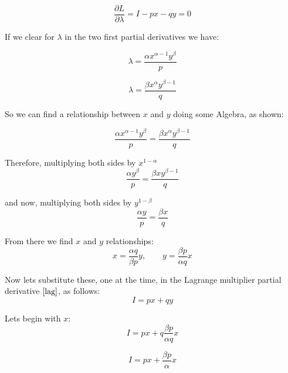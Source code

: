 \documentclass{article}
\begin{document}
  \begin{equation}\label{lag}
    \frac{\partial L}{\partial \lambda} = I - px - qy = 0
  \end{equation}

If we clear for $\lambda$ in the two first partial derivatives we have:

  \begin{equation}
    \lambda = \frac{\alpha x^{\alpha - 1} y^\beta}{p}
  \end{equation}

  \begin{equation}
    \lambda = \frac{\beta x^\alpha y^{\beta - 1}}{q}
  \end{equation}

So we can find a relationship between $x$ and $y$ doing some Algebra, as shown:

  \begin{equation}
    \frac{\alpha x^{\alpha - 1} y^\beta}{p} = \frac{\beta x^\alpha y^{\beta - 1}}{q}
  \end{equation}

Therefore, multiplying both sides by $x^{1 - \alpha}$
  \begin{equation}
    \frac{\alpha y^\beta}{p} = \frac{\beta x  y^{\beta - 1}}{q}
  \end{equation}

and now, multiplying both sides by $y^{1 - \beta}$
  \begin{equation}
    \frac{\alpha y}{p} = \frac{\beta x}{q}
  \end{equation}

From there we find $x$ and $y$ relationships:
  \begin{equation}
   x = \frac{\alpha q}{\beta p}y, \qquad y = \frac{\beta p}{\alpha q}x
  \end{equation}

Now lets substitute these, one at the time, in the Lagrange multiplier partial derivative $\ref{lag}$, as follows:
  \begin{equation}
    I = px + qy
  \end{equation}

Lets begin with $x$:
  \begin{equation}
    I = px + q\frac{\beta p}{\alpha q}x
  \end{equation}

  \begin{equation}
    I = px + \frac{\beta p}{\alpha}x
  \end{equation}
\end{document}
